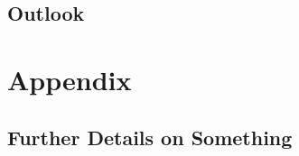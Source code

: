 \documentclass[%
  a4paper,fontsize=11pt,abstract=on,%
  twoside,BCOR=19mm,%
]{scrreprt}
\begin{document}
\section{Outlook}
\lipsum[1-3]



\appendix
\chapter{Appendix}
\section{Further Details on Something}
\lipsum



\printbibliography


\end{document}
